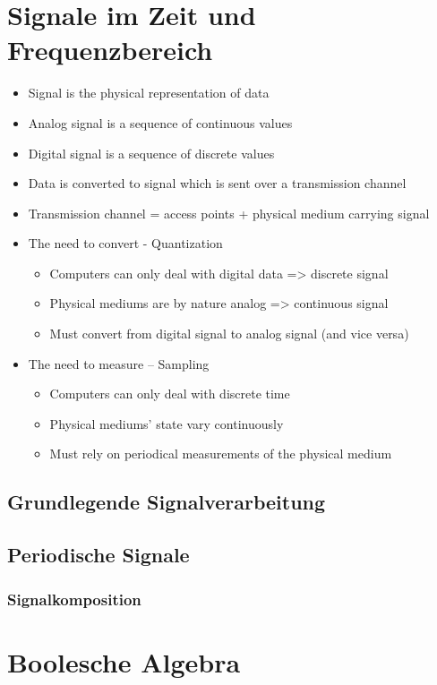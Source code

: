 \documentclass[numbers=endperiod]{scrartcl}
\begin{document}
\section{Signale im Zeit und Frequenzbereich}
\begin{itemize}
	\item Signal is the physical representation of data
	\item Analog signal is a sequence of continuous values
	\item Digital signal is a sequence of discrete values
	\item Data is converted to signal which is sent over a transmission channel
	\item Transmission channel = access points + physical medium carrying signal
	\item The need to convert - Quantization
	\begin{itemize}
		\item Computers can only deal with digital data => discrete signal
		\item Physical mediums are by nature analog => continuous signal
		\item Must convert from digital signal to analog signal (and vice versa)
	\end{itemize}
	\item The need to measure -- Sampling
	\begin{itemize}
		\item Computers can only deal with discrete time
		\item Physical mediums’ state vary continuously
		\item Must rely on periodical measurements of the physical medium
	\end{itemize}
\end{itemize}

\subsection{Grundlegende Signalverarbeitung}
\subsection{Periodische Signale}

\subsubsection{Signalkomposition}

\section{Boolesche Algebra}
\end{document}
